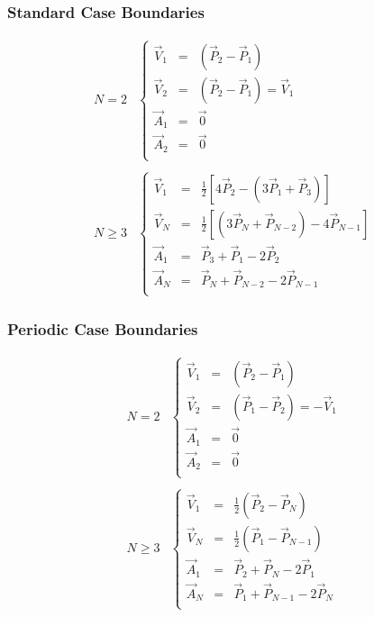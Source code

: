 \documentclass[aps,12pt]{revtex4}
\begin{document}
\subsubsection{Standard Case Boundaries}
\begin{equation}
\begin{array}{rl}
N=2 &
	\left\lbrace
	\begin{array}{rcl}
	\vec{V}_1 & = &  \left( \vec{P}_2 - \vec{P}_1\right)\\
	\vec{V}_2 & = &  \left( \vec{P}_2 - \vec{P}_1\right) = \vec{V}_1\\
	\vec{A}_1 & = & \vec{0}\\
	\vec{A}_2 & = & \vec{0}\\
	\end{array}
	\right.
	\\
	\\
	N\geq3 & 
	\left\lbrace
	\begin{array}{rcl}
	\vec{V}_1 & = & \frac{1}{2} \left[ 4\vec{P}_2     - (3\vec{P}_1+\vec{P}_3)\right]\\
	\vec{V}_N & = & \frac{1}{2} \left[ (3\vec{P}_{N}+\vec{P}_{N-2})-4\vec{P}_{N-1} \right]\\
	\vec{A}_1 & = & \vec{P}_3+\vec{P}_1-2\vec{P}_2         \\
	\vec{A}_N & = & \vec{P}_N+\vec{P}_{N-2}-2\vec{P}_{N-1} \\
	\end{array}
	\right.
\end{array}
\end{equation}

 
\subsubsection{Periodic Case Boundaries}

\begin{equation}
\begin{array}{rl}
N=2 &
	\left\lbrace
	\begin{array}{rcl}
	\vec{V}_1 & = &  \left( \vec{P}_2 - \vec{P}_1\right)\\
	\vec{V}_2 & = &  \left( \vec{P}_1 - \vec{P}_2\right) = -\vec{V}_1\\
	\vec{A}_1 & = & \vec{0}\\
	\vec{A}_2 & = & \vec{0}\\
	\end{array}
	\right.
	\\
	\\
	N\geq3 & 
	\left\lbrace
	\begin{array}{rcl}
	\vec{V}_1 & = & \frac{1}{2} \left( \vec{P}_2 - \vec{P}_N\right)\\
	\vec{V}_N & = & \frac{1}{2} \left( \vec{P}_1 - \vec{P}_{N-1}\right)\\
	\vec{A}_1 & = & \vec{P}_2+\vec{P}_{N}-2\vec{P}_1         \\
	\vec{A}_N & = & \vec{P}_1+\vec{P}_{N-1}-2\vec{P}_{N} \\
	\end{array}
	\right.
\end{array}
\end{equation}
\end{document}
